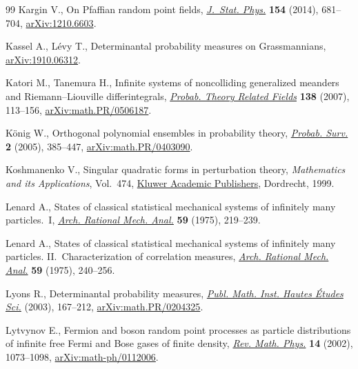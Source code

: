 \documentclass[pdftex]{sigma}
\numberwithin{equation}{section}
\begin{document}
\begin{thebibliography}{99}
Kargin V., On {P}faffian random point fields, \href{https://doi.org/10.1007/s10955-013-0900-z}{\textit{J.~Stat. Phys.}}
 \textbf{154} (2014), 681--704, \href{https://arxiv.org/abs/1210.6603}{arXiv:1210.6603}.

Kassel A., L\'evy T., Determinantal probability measures on {G}rassmannians,
 \href{https://arxiv.org/abs/1910.06312}{arXiv:1910.06312}.

Katori M., Tanemura H., Infinite systems of noncolliding generalized meanders
 and {R}iemann--{L}iouville differintegrals, \href{https://doi.org/10.1007/s00440-006-0015-4}{\textit{Probab. Theory Related
 Fields}} \textbf{138} (2007), 113--156, \href{https://arxiv.org/abs/math.PR/0506187}{arXiv:math.PR/0506187}.

K\"onig W., Orthogonal polynomial ensembles in probability theory,
 \href{https://doi.org/10.1214/154957805100000177}{\textit{Probab. Surv.}} \textbf{2} (2005), 385--447, \href{https://arxiv.org/abs/math.PR/0403090}{arXiv:math.PR/0403090}.

Koshmanenko V., Singular quadratic forms in perturbation theory,
 \textit{Mathematics and its Applications}, Vol.~474, \href{https://doi.org/10.1007/978-94-011-4619-7}{Kluwer Academic
 Publishers}, Dordrecht, 1999.

Lenard A., States of classical statistical mechanical systems of infinitely
 many particles.~{I}, \href{https://doi.org/10.1007/BF00251601}{\textit{Arch. Rational Mech. Anal.}} \textbf{59} (1975),
 219--239.

Lenard A., States of classical statistical mechanical systems of infinitely
 many particles. {II}.~Characterization of correlation measures, \href{https://doi.org/10.1007/BF00251602}{\textit{Arch.
 Rational Mech. Anal.}} \textbf{59} (1975), 240--256.

Lyons R., Determinantal probability measures, \href{https://doi.org/10.1007/s10240-003-0016-0}{\textit{Publ. Math. Inst. Hautes
 \'Etudes Sci.}} (2003), 167--212, \href{https://arxiv.org/abs/math.PR/0204325}{arXiv:math.PR/0204325}.

Lytvynov E., Fermion and boson random point processes as particle distributions
 of infinite free {F}ermi and {B}ose gases of finite density, \href{https://doi.org/10.1142/S0129055X02001533}{\textit{Rev.
 Math. Phys.}} \textbf{14} (2002), 1073--1098, \href{https://arxiv.org/abs/math-ph/0112006}{arXiv:math-ph/0112006}.


\end{thebibliography}
\end{document}
